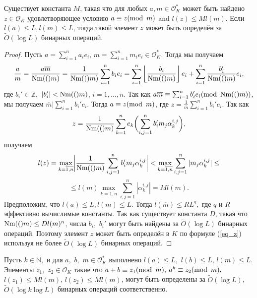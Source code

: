 \documentclass[_00_dissertation.tex]{subfiles}
\begin{document}
\begin{statement}\label{statement:mod}
    Существует константа $M$, такая что для любых $a, m \in \mathcal{O}_K^*$ может быть найдено $z \in \mathcal{O}_K$ удовлетворяющее условию $a\equiv z(\textrm{mod }\,m)$ and $l(z)\leq Ml(m)$. Если $l(a)\leq L, l(m)\leq L$, тогда такой элемент $z$ может быть определён за $\tilde{O}(\log L)$ бинарных операций.
\end{statement}

\begin{proof}
    Пусть $a = \sum_{i=1}^n a_i e_i$, $m = \sum_{i=1}^n m_i e_i \in \mathcal{O}_K^*$. Тогда мы получаем
    \begin{equation}
        \frac{a}{m} = \frac{a\overline{m}}{\textrm{Nm}(()m)} = \frac{1}{\textrm{Nm}(()m)}\sum\limits_{i=1}^n b_i e_i = \sum\limits_{i=1}^n \left\lfloor\frac{b_i}{\textrm{Nm}(()m)}\right\rfloor e_i + \sum\limits_{i=1}^n \frac{b_i'}{\textrm{Nm}(()m)} e_i,
    \end{equation}
    где $b_i' \in \mathbb{Z},$ $|b_i'| < \textrm{Nm}(()m)$, $i=1,\ldots,n$.
    Так как $a\overline{m} \equiv \sum_{i=1}^n b_i' e_i(\textrm{mod }\,\textrm{Nm}(()m))$, мы получаем $\overline{m}\big|\sum_{i=1}^n b_i' e_i$.
    Тогда $a\equiv z(\textrm{mod }\,m)$, где $z = \frac{1}{\overline{m}}\sum_{i=1}^n b_i' e_i$.
    Так как
    \begin{equation} \label{eq_z}
        z= \frac{1}{\textrm{Nm}(()m)}\sum\limits_{k=1}^n e_k\biggl(\sum\limits_{i, j = 1}^n b_i' m_j \alpha_k^{i, j}\biggr),
    \end{equation}
    получаем
    \begin{equation}
        l(z) = \max_{k = \overline{1, n}} \biggl|\frac{1}{\textrm{Nm}(()m)}\sum\limits_{i, j = 1}^n b_i' m_j \alpha_k^{i, j}\biggr| < \max_{k = \overline{1, n}} \sum_{i, j = 1}^n |m_j \alpha_k^{i, j}| \le \nonumber
    \end{equation}
    \begin{equation}
        \le l(m) \max_{k = \overline{1, n}} \sum_{i, j = 1}^n |\alpha_k^{i, j}|= Ml(m).
    \end{equation}
    Предположим, что $l(a)\leq L, l(m)\leq L$. Тогда $l(\overline{m}) \le RL^q,$ где $q$ и $R$ эффективно вычислимые константы.
    Так как существует константа $D$, такая что $\textrm{Nm}(()m)\le D l(m)^n$, числа $b_i,$ $b_i'$ могут быть найдены за $\tilde{O}(\log L)$ бинарных операций.
    Поэтому элемент $z$ может быть определён в $K$ по формуле (\ref{eq_z}) используя не более $\tilde{O}(\log L)$ бинарных операций.
\end{proof}

\begin{corollary}\label{corollary_mod}
    Пусть $k \in \mathbb{N},$ и для $a,$ $b,$ $m \in \mathcal{O}_K^*$ выполнено $l(a)\leq L,$ $l(b)\leq L$, $l(m)\leq L$.
    Элементы $z_1,$ $z_2\in \mathcal{O}_K$ такие что $a+b\equiv z_1(\textrm{mod }\,m),$ $a^k\equiv z_2(\textrm{mod }\,m),$ $l(z_1)\leq Ml(m)$, $l(z_2)\leq Ml(m)$, могут быть определены за $\tilde{O}(\log L)$, $\tilde{O}(\log k \log L)$  бинарных операций соответственно.
\end{corollary}
\end{document}
